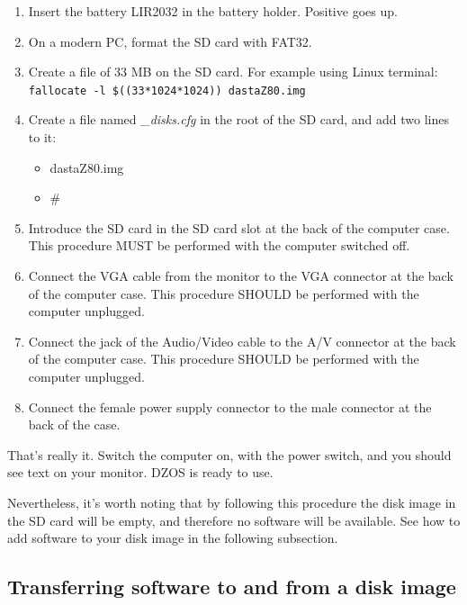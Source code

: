 \documentclass[a4paper,11pt]{article}
\begin{document}
    \begin{enumerate}
        \item Insert the battery LIR2032 in the battery holder. Positive goes up.
        \item On a modern PC, format the SD card with FAT32.
        \item Create a file of 33 MB on the SD card. For example using Linux 
        terminal:  \texttt{fallocate -l \$((33*1024*1024)) dastaZ80.img}
        \item Create a file named \textit{\_disks.cfg} in the root of the SD card,
        and add two lines to it:
        \begin{itemize}
            \item dastaZ80.img
            \item \#
        \end{itemize}
        \item Introduce the SD card in the SD card slot at the back of the
        computer case. This procedure MUST be performed with the computer
        switched off.
        \item Connect the VGA cable from the monitor to the VGA connector at the
        back of the computer case. This procedure SHOULD be performed with the
        computer unplugged.
        \item Connect the jack of the Audio/Video cable to the A/V connector at
        the back of the computer case. This procedure SHOULD be performed with
        the computer unplugged.
        \item Connect the female power supply connector to the male connector at
        the back of the case.
    \end{enumerate}

    That’s really it. Switch the computer on, with the power switch, and you
    should see text on your monitor. DZOS is ready to use.

    Nevertheless, it's worth noting that by following this procedure the disk
    image in the SD card will be empty, and therefore no software will be
    available. See how to add software to your disk image in the following
    subsection.

    \subsection{Transferring software to and from a disk image}
\end{document}
